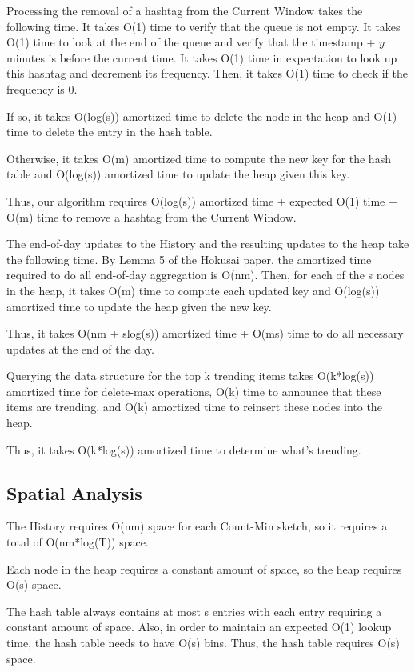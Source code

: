 \documentclass[twoside]{article}
\begin{document}
Processing the removal of a hashtag from the Current Window takes the following time.  It takes O(1) time to verify that the queue is not empty.  It takes O(1) time to look at the end of the queue and verify that the timestamp + $y$ minutes is before the current time.  It takes O(1) time in expectation to look up this hashtag and decrement its frequency.  Then, it takes O(1) time to check if the frequency is 0.

If so, it takes O(log(s)) amortized time to delete the node in the heap and O(1) time to delete the entry in the hash table.

Otherwise, it takes O(m) amortized time to compute the new key for the hash table and O(log(s)) amortized time to update the heap given this key.

Thus, our algorithm requires O(log(s)) amortized time + expected O(1) time  + O(m) time to remove a hashtag from the Current Window.

The end-of-day updates to the History and the resulting updates to the heap take the following time.  By Lemma 5 of the Hokusai paper, the amortized time required to do all end-of-day aggregation is O(nm).  Then, for each of the s nodes in the heap, it takes O(m) time to compute each updated key and O(log(s)) amortized time to update the heap given the new key.

Thus, it takes O(nm + slog(s)) amortized time + O(ms) time to do all necessary updates at the end of the day.

Querying the data structure for the top k trending items takes O(k*log(s)) amortized time for delete-max operations, O(k) time to announce that these items are trending, and O(k) amortized time to reinsert these nodes into the heap.

Thus, it takes O(k*log(s)) amortized time to determine what’s trending.


\subsection{Spatial Analysis}

The History requires O(nm) space for each Count-Min sketch, so it requires a total of O(nm*log(T)) space.

Each node in the heap requires a constant amount of space, so the heap requires O(s) space.

The hash table always contains at most s entries with each entry requiring a constant amount of space.  Also, in order to maintain an expected O(1) lookup time, the hash table needs to have O(s) bins.  Thus, the hash table requires O(s) space.
\end{document}

